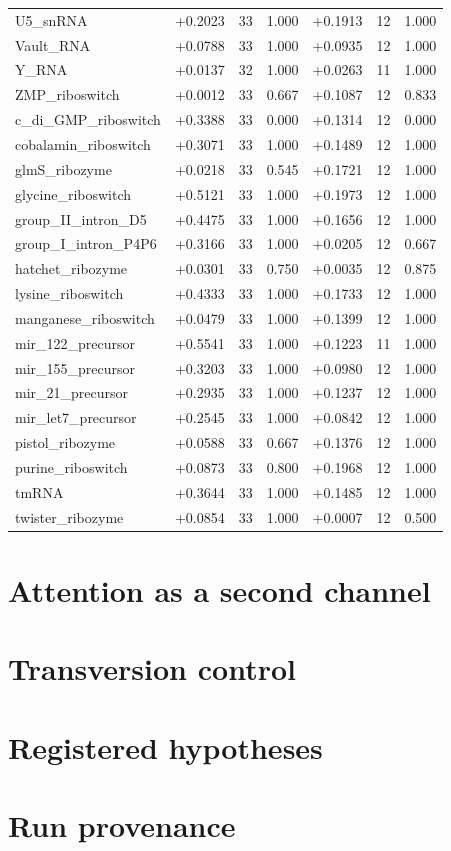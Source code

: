 \documentclass[11pt]{article}
\begin{document}
\begin{longtable}{@{}lrrrrrr@{}}
U5\_snRNA & +0.2023 & 33 & 1.000 & +0.1913 & 12 & 1.000 \\
Vault\_RNA & +0.0788 & 33 & 1.000 & +0.0935 & 12 & 1.000 \\
Y\_RNA & +0.0137 & 32 & 1.000 & +0.0263 & 11 & 1.000 \\
ZMP\_riboswitch & +0.0012 & 33 & 0.667 & +0.1087 & 12 & 0.833 \\
c\_di\_GMP\_riboswitch & +0.3388 & 33 & 0.000 & +0.1314 & 12 & 0.000 \\
cobalamin\_riboswitch & +0.3071 & 33 & 1.000 & +0.1489 & 12 & 1.000 \\
glmS\_ribozyme & +0.0218 & 33 & 0.545 & +0.1721 & 12 & 1.000 \\
glycine\_riboswitch & +0.5121 & 33 & 1.000 & +0.1973 & 12 & 1.000 \\
group\_II\_intron\_D5 & +0.4475 & 33 & 1.000 & +0.1656 & 12 & 1.000 \\
group\_I\_intron\_P4P6 & +0.3166 & 33 & 1.000 & +0.0205 & 12 & 0.667 \\
hatchet\_ribozyme & +0.0301 & 33 & 0.750 & +0.0035 & 12 & 0.875 \\
lysine\_riboswitch & +0.4333 & 33 & 1.000 & +0.1733 & 12 & 1.000 \\
manganese\_riboswitch & +0.0479 & 33 & 1.000 & +0.1399 & 12 & 1.000 \\
mir\_122\_precursor & +0.5541 & 33 & 1.000 & +0.1223 & 11 & 1.000 \\
mir\_155\_precursor & +0.3203 & 33 & 1.000 & +0.0980 & 12 & 1.000 \\
mir\_21\_precursor & +0.2935 & 33 & 1.000 & +0.1237 & 12 & 1.000 \\
mir\_let7\_precursor & +0.2545 & 33 & 1.000 & +0.0842 & 12 & 1.000 \\
pistol\_ribozyme & +0.0588 & 33 & 0.667 & +0.1376 & 12 & 1.000 \\
purine\_riboswitch & +0.0873 & 33 & 0.800 & +0.1968 & 12 & 1.000 \\
tmRNA & +0.3644 & 33 & 1.000 & +0.1485 & 12 & 1.000 \\
twister\_ribozyme & +0.0854 & 33 & 1.000 & +0.0007 & 12 & 0.500 \\
\bottomrule
\end{longtable}


\section*{Attention as a second channel}



\section*{Transversion control}



\section*{Registered hypotheses}



\section*{Run provenance}


\end{document}

